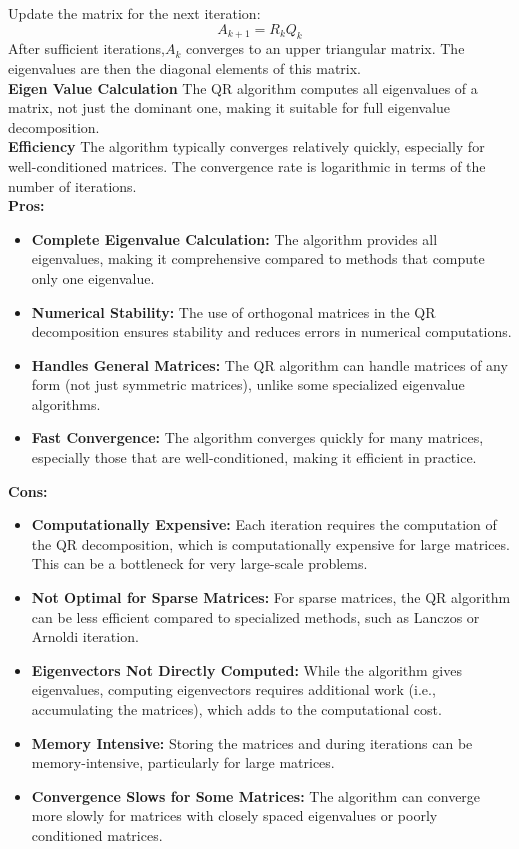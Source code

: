 \documentclass[journal]{IEEEtran}
\begin{document}
\begin{enumerate}
Update the matrix for the next iteration:
		\[ A_{k+1}=R_kQ_k \]
After sufficient iterations,$A_k$ converges to an upper triangular matrix. The eigenvalues are then the diagonal elements of this matrix.\\
\textbf{Eigen Value Calculation}
The QR algorithm computes all eigenvalues of a matrix, not just the dominant one, making it suitable for full eigenvalue decomposition.\\
\textbf{Efficiency}
The algorithm typically converges relatively quickly, especially for well-conditioned matrices. The convergence rate is logarithmic in terms of the number of iterations.\\
\textbf{Pros:}
\begin{itemize}
\item \textbf{Complete Eigenvalue Calculation:} The algorithm provides all eigenvalues, making it comprehensive compared to methods that compute only one eigenvalue.
\item \textbf{Numerical Stability:} The use of orthogonal matrices in the QR decomposition ensures stability and reduces errors in numerical computations.
\item \textbf{Handles General Matrices:} The QR algorithm can handle matrices of any form (not just symmetric matrices), unlike some specialized eigenvalue algorithms.
\item \textbf{Fast Convergence:} The algorithm converges quickly for many matrices, especially those that are well-conditioned, making it efficient in practice.
\end{itemize}
\textbf{Cons:}
\begin{itemize}
\item \textbf{Computationally Expensive:} Each iteration requires the computation of the QR decomposition, which is computationally expensive for large matrices. This can be a bottleneck for very large-scale problems.
\item \textbf{Not Optimal for Sparse Matrices:} For sparse matrices, the QR algorithm can be less efficient compared to specialized methods, such as Lanczos or Arnoldi iteration.
\item \textbf{Eigenvectors Not Directly Computed:} While the algorithm gives eigenvalues, computing eigenvectors requires additional work (i.e., accumulating the  matrices), which adds to the computational cost.
\item \textbf{Memory Intensive:} Storing the matrices  and  during iterations can be memory-intensive, particularly for large matrices.
\item \textbf{Convergence Slows for Some Matrices:} The algorithm can converge more slowly for matrices with closely spaced eigenvalues or poorly conditioned matrices.

\end{itemize}
\end{enumerate}
\end{document}
